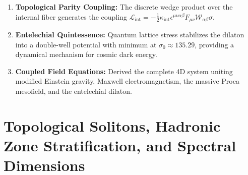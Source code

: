 \documentclass[
    12pt,
    a4paper,
    headings=normal,
    twoside=false,
    open=any,
    parskip=half
]{scrbook}
\begin{document}
\begin{tcolorbox}[colback=maincolor!3!white, colframe=maincolor!80!black, title={\textbf{Grand Synthesis of Chapter 2}}]
\begin{enumerate}[leftmargin=1.5em, itemsep=5pt]
    \item \textbf{Topological Parity Coupling:} The discrete wedge product over the internal fiber generates the coupling $\mathcal{L}_{\text{int}} = -\frac{1}{2}\kappa_{\text{int}}\epsilon^{\mu\nu\alpha\beta}F_{\mu\nu}\mathcal{W}_{\alpha\beta}\sigma$.
    \item \textbf{Entelechial Quintessence:} Quantum lattice stress stabilizes the dilaton into a double-well potential with minimum at $\sigma_0 \approx 135.29$, providing a dynamical mechanism for cosmic dark energy.
    \item \textbf{Coupled Field Equations:} Derived the complete 4D system uniting modified Einstein gravity, Maxwell electromagnetism, the massive Proca mesofield, and the entelechial dilaton.
\end{enumerate}
\end{tcolorbox}

\chapter{Topological Solitons, Hadronic Zone Stratification, and Spectral Dimensions}
\label{chap:ch3_expanded}
\end{document}
